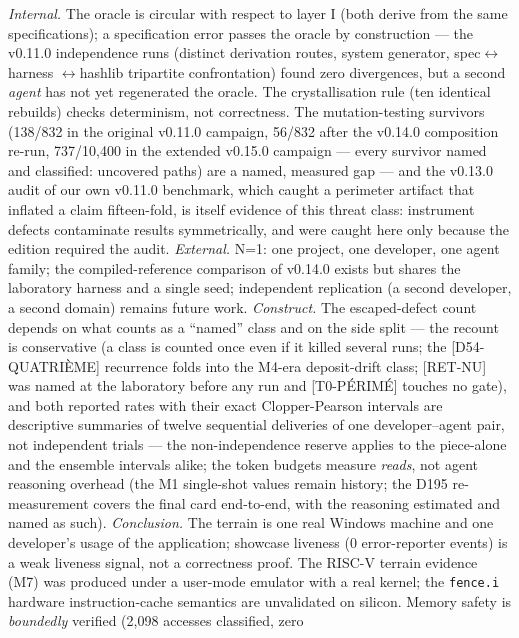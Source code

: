 \documentclass[11pt,a4paper]{article}
\newcommand{\code}[1]{\texttt{\small #1}}
\begin{document}
\emph{Internal.} The oracle is circular with respect to layer I
(both derive from the same specifications); a specification error passes
the oracle by construction --- the v0.11.0 independence runs (distinct
derivation routes, system generator, spec$\leftrightarrow$\allowbreak harness
$\leftrightarrow$\allowbreak hashlib tripartite confrontation) found zero
divergences, but a second \emph{agent} has not yet regenerated the
oracle. The crystallisation rule (ten identical rebuilds) checks
determinism, not correctness. The mutation-testing survivors (138/832
in the original v0.11.0 campaign, 56/832 after the v0.14.0 composition
re-run, 737/10{,}400 in the extended v0.15.0 campaign --- every
survivor named and classified: uncovered paths) are a named, measured
gap --- and the v0.13.0 audit of
our own v0.11.0 benchmark, which caught a perimeter artifact that
inflated a claim fifteen-fold, is itself evidence of this threat class:
instrument defects contaminate results symmetrically, and were caught
here only because the edition required the audit. \emph{External.} N=1: one
project, one developer, one agent family; the compiled-reference
comparison of v0.14.0 exists but shares the laboratory harness and a
single seed; independent replication (a second developer, a second
domain) remains future work. \emph{Construct.} The
escaped-defect count depends on what counts as a ``named'' class and on
the side split --- the recount is conservative (a class is counted once
even if it killed several runs; the [D54-QUATRI\`EME] recurrence folds
into the M4-era deposit-drift class; [RET-NU] was named at the
laboratory before any run and [T0-P\'ERIM\'E] touches no gate), and
both reported rates with their exact Clopper-Pearson intervals are
descriptive summaries of twelve sequential deliveries of one
developer--agent pair, not independent trials --- the
non-independence reserve applies to the piece-alone and the ensemble
intervals alike; the token budgets measure \emph{reads}, not agent
reasoning overhead (the M1 single-shot values remain history; the D195
re-measurement covers the final card end-to-end, with the reasoning
estimated and named as such).
\emph{Conclusion.} The terrain is one real Windows machine and one
developer's usage of the application; showcase liveness (0 error-reporter
events) is a weak liveness signal, not a correctness proof. The RISC-V terrain
evidence (M7) was produced under a user-mode emulator with a real
kernel; the \code{fence.i} hardware instruction-cache semantics are
unvalidated on silicon. Memory safety
is \emph{boundedly} verified (2{,}098 accesses classified, zero
\end{document}
